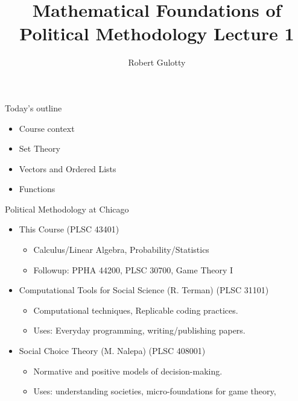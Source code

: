 \documentclass[aspectratio=169, handout]{beamer}
\title[PLSC 43401]{Mathematical Foundations of Political Methodology Lecture 1}
\author{Robert Gulotty}
\institute[University of Chicago]{Department of Political Science \\  University of Chicago}
\date{}
\numberwithin{equation}{section}
\begin{document}
\begin{frame}
\titlepage
\end{frame}







\begin{frame}{Today's outline}

\begin{itemize}

\item \textcolor{myblack}{Course context}
\item \textcolor{myblack}{Set Theory}
\item \textcolor{myblack}{Vectors and Ordered Lists}
\item \textcolor{myblack}{Functions}
\end{itemize}

\end{frame}

\begin{frame}{Political Methodology at Chicago}

\begin{itemize}
\item This Course (PLSC 43401)
\begin{itemize}
\item Calculus/Linear Algebra, Probability/Statistics
\item Followup: PPHA 44200, PLSC 30700, Game Theory I
\end{itemize}
\item Computational Tools for Social Science (R. Terman) (PLSC 31101)
\begin{itemize}
\item Computational techniques, Replicable coding practices.
\item Uses: Everyday programming, writing/publishing papers. 
\end{itemize}
\item Social Choice Theory (M. Nalepa) (PLSC 408001)
\begin{itemize}
\item Normative and positive models of decision-making.
\item Uses: understanding societies, micro-foundations for game theory, 
\end{itemize}
\end{itemize}
\end{frame}
\end{document}
